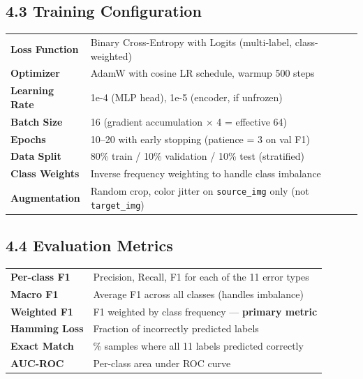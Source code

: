 \documentclass[11pt,a4paper]{article}
\begin{document}
\subsection{4.3 Training Configuration}

\begin{tabularx}{\textwidth}{>{\bfseries}lX}
\toprule
Loss Function & Binary Cross-Entropy with Logits (multi-label, class-weighted) \\
\rowcolor{lightgray}
Optimizer & AdamW with cosine LR schedule, warmup 500 steps \\
Learning Rate & 1e-4 (MLP head), 1e-5 (encoder, if unfrozen) \\
\rowcolor{lightgray}
Batch Size & 16 (gradient accumulation $\times$ 4 = effective 64) \\
Epochs & 10–20 with early stopping (patience = 3 on val F1) \\
\rowcolor{lightgray}
Data Split & 80\% train / 10\% validation / 10\% test (stratified) \\
Class Weights & Inverse frequency weighting to handle class imbalance \\
\rowcolor{lightgray}
Augmentation & Random crop, color jitter on \texttt{source\_img} only (not \texttt{target\_img}) \\
\bottomrule
\end{tabularx}

\subsection{4.4 Evaluation Metrics}

\begin{tabularx}{\textwidth}{>{\bfseries}lX}
\toprule
Per-class F1 & Precision, Recall, F1 for each of the 11 error types \\
\rowcolor{lightgray}
Macro F1 & Average F1 across all classes (handles imbalance) \\
Weighted F1 & F1 weighted by class frequency — \textbf{primary metric} \\
\rowcolor{lightgray}
Hamming Loss & Fraction of incorrectly predicted labels \\
Exact Match & \% samples where all 11 labels predicted correctly \\
\rowcolor{lightgray}
AUC-ROC & Per-class area under ROC curve \\
\bottomrule
\end{tabularx}

\end{document}

